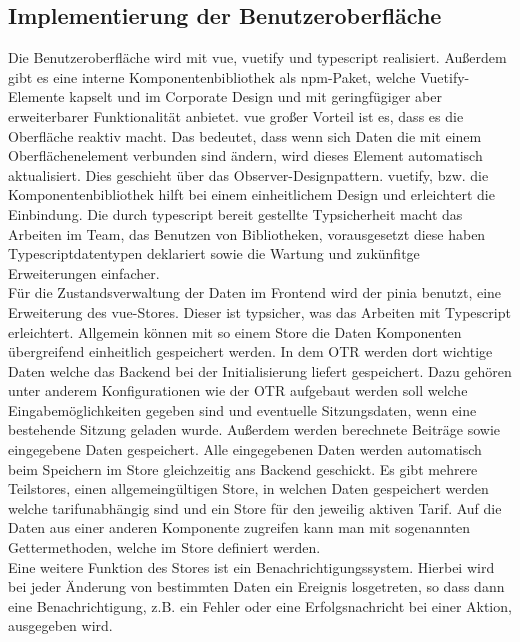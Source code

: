 \subsection{Implementierung der Benutzeroberfläche}
\label{oberflacheimplemetieren}
Die Benutzeroberfläche wird mit \gls{vue}, \gls{vuetify} und \gls{typescript} realisiert. Außerdem gibt es eine interne Komponentenbibliothek als \gls{npm}-Paket, welche Vuetify-Elemente kapselt und im Corporate Design und mit geringfügiger aber erweiterbarer Funktionalität anbietet. \gls{vue} großer Vorteil ist es, dass es die Oberfläche reaktiv macht. Das bedeutet, dass wenn sich Daten die mit einem Oberflächenelement verbunden sind ändern, wird dieses Element automatisch aktualisiert. Dies geschieht über das Observer-Designpattern. \gls{vuetify}, bzw. die Komponentenbibliothek hilft bei einem einheitlichem Design und erleichtert die Einbindung. Die durch \gls{typescript} bereit gestellte Typsicherheit macht das Arbeiten im Team, das Benutzen von Bibliotheken, vorausgesetzt diese haben Typescriptdatentypen deklariert sowie die Wartung und zukünfitge Erweiterungen einfacher.\\
Für die Zustandsverwaltung der Daten im Frontend wird der \gls{pinia} benutzt, eine Erweiterung des \gls{vue}-Stores. Dieser ist typsicher, was das Arbeiten mit Typescript erleichtert. Allgemein können mit so einem Store die Daten Komponenten übergreifend einheitlich gespeichert werden. In dem \ac{OTR} werden dort wichtige Daten welche das Backend bei der Initialisierung liefert gespeichert. Dazu gehören unter anderem Konfigurationen wie der \ac{OTR} aufgebaut werden soll welche Eingabemöglichkeiten gegeben sind und eventuelle Sitzungsdaten, wenn eine bestehende Sitzung geladen wurde. Außerdem werden berechnete Beiträge sowie eingegebene Daten gespeichert. Alle eingegebenen Daten werden automatisch beim Speichern im Store gleichzeitig ans Backend geschickt. Es gibt mehrere Teilstores, einen allgemeingültigen Store, in welchen Daten gespeichert werden welche tarifunabhängig sind und ein Store für den jeweilig aktiven Tarif. Auf die Daten aus einer anderen Komponente zugreifen kann man mit sogenannten Gettermethoden, welche im Store definiert werden.\\
Eine weitere Funktion des Stores ist ein Benachrichtigungssystem. Hierbei wird bei jeder Änderung von bestimmten Daten ein Ereignis losgetreten, so dass dann eine Benachrichtigung, z.B. ein Fehler oder eine Erfolgsnachricht bei einer Aktion, ausgegeben wird.\\

